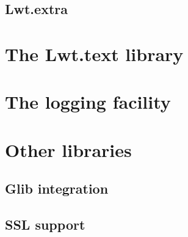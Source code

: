 \documentclass{article}
\begin{document}
\subsection{Lwt.extra}

\section{The Lwt.text library}

\section{The logging facility}

\section{Other libraries}

\subsection{Glib integration}
\subsection{SSL support}
\end{document}
